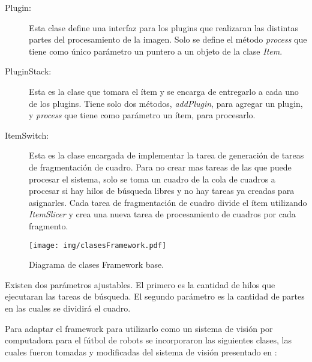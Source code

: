 \begin{description}
	\item[Plugin:] Esta clase define una interfaz para los plugins que
		realizaran las distintas partes del procesamiento de la imagen.
		Solo se define el método \emph{process} que tiene como único
		parámetro un puntero a un objeto de la clase \emph{Item}.

	\item[PluginStack:] Esta es la clase que tomara el ítem y se encarga de
		entregarlo a cada uno de los plugins. Tiene solo dos métodos,
		\emph{addPlugin}, para agregar un plugin, y \emph{process} que
		tiene como parámetro un ítem, para procesarlo.

	\item[ItemSwitch:] Esta es la clase encargada de implementar la tarea de
		generación de tareas de fragmentación de cuadro. Para no crear
		mas tareas de las que puede procesar el sistema, solo se toma un
		cuadro de la cola de cuadros a procesar si hay hilos de búsqueda
		libres y no hay tareas ya creadas para asignarles. Cada tarea de
		fragmentación de cuadro divide el ítem utilizando
		\emph{ItemSlicer} y crea una nueva tarea de procesamiento de
		cuadros por cada fragmento.

\end{description}

\begin{figure}[h]

	\texttt{[image: img/clasesFramework.pdf]}

	\caption{Diagrama de clases Framework base.}

\end{figure}

Existen dos parámetros ajustables. El primero es la cantidad de hilos que
ejecutaran las tareas de búsqueda. El segundo parámetro es la cantidad de partes
en las cuales se dividirá el cuadro.

Para adaptar el framework para utilizarlo como un sistema de visión por
computadora para el fútbol de robots se incorporaron las siguientes clases, las
cuales fueron tomadas y modificadas del sistema de visión presentado en
\cite{torres2014}:

